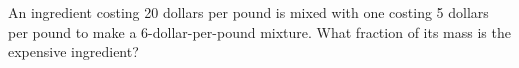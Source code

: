 An ingredient costing 20 dollars per pound is mixed with one costing 5 dollars per pound to make a 6-dollar-per-pound mixture. What fraction of its mass is the expensive ingredient?
